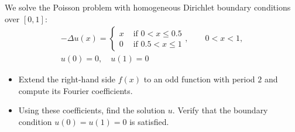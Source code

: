 \documentclass[11pt]{article}
\begin{document}
\begin{exercise}
    We solve the Poisson problem with homogeneous Dirichlet boundary conditions over $[0,1]$:
    \begin{gather*}
        - \Delta u(x) = \left\{\begin{array}{ll} x & \text{ if } 0 < x \leq 0.5 \\ 0 & \text{ if } 0.5 < x \leq 1 \end{array}\right., \qquad 0 < x < 1,
        \\
        u(0) = 0, \quad u(1) = 0
    \end{gather*}
    \begin{itemize}
        \item Extend the right-hand side $f(x)$ to an odd function with period $2$ and compute its Fourier coefficients.
        \item Using these coefficients, find the solution $u$. Verify that the boundary condition $u(0) = u(1) = 0$ is satisfied.
    \end{itemize}
\end{exercise}
\end{document}
